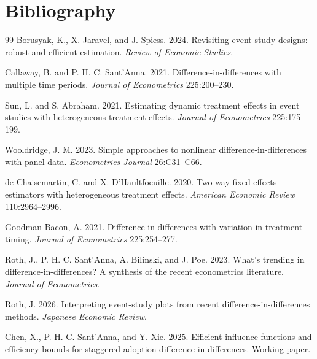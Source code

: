 \documentclass[11pt]{article}
\theoremstyle{definition}
\theoremstyle{plain}
\theoremstyle{remark}
\begin{document}
\section*{Bibliography}
\begin{thebibliography}{99}
Borusyak, K., X. Jaravel, and J. Spiess. 2024. Revisiting event-study
designs: robust and efficient estimation. \emph{Review of Economic Studies}.

Callaway, B. and P. H. C. Sant'Anna. 2021. Difference-in-differences with
multiple time periods. \emph{Journal of Econometrics} 225:200--230.

Sun, L. and S. Abraham. 2021. Estimating dynamic treatment effects in event
studies with heterogeneous treatment effects. \emph{Journal of Econometrics}
225:175--199.

Wooldridge, J. M. 2023. Simple approaches to nonlinear
difference-in-differences with panel data. \emph{Econometrics Journal}
26:C31--C66.

de Chaisemartin, C. and X. D'Haultfoeuille. 2020. Two-way fixed effects
estimators with heterogeneous treatment effects. \emph{American Economic
Review} 110:2964--2996.

Goodman-Bacon, A. 2021. Difference-in-differences with variation in treatment
timing. \emph{Journal of Econometrics} 225:254--277.

Roth, J., P. H. C. Sant'Anna, A. Bilinski, and J. Poe. 2023. What's trending
in difference-in-differences? A synthesis of the recent econometrics
literature. \emph{Journal of Econometrics}.

Roth, J. 2026. Interpreting event-study plots from recent
difference-in-differences methods. \emph{Japanese Economic Review}.

Chen, X., P. H. C. Sant'Anna, and Y. Xie. 2025. Efficient influence functions
and efficiency bounds for staggered-adoption difference-in-differences.
Working paper.
\end{thebibliography}
\end{document}
